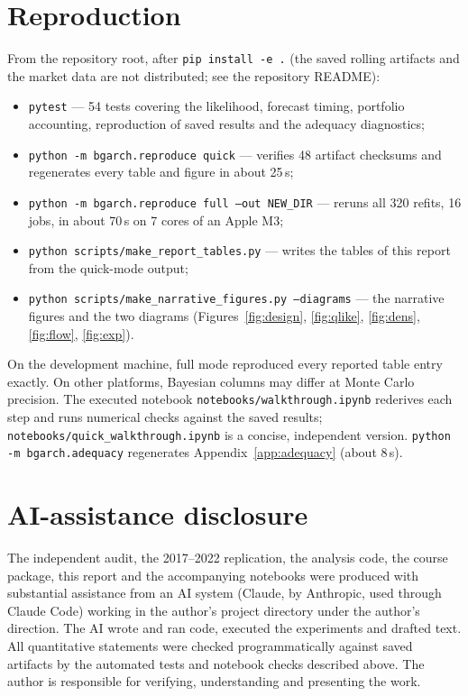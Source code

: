 \documentclass[11pt]{article}
\begin{document}
\section{Reproduction}\label{app:repro}
From the repository root, after \texttt{pip install -e .} (the saved rolling artifacts and the market data are not distributed; see the repository README):
\begin{itemize}
\item \texttt{pytest} --- 54 tests covering the likelihood, forecast timing, portfolio accounting, reproduction of saved results and the adequacy diagnostics;
\item \texttt{python -m bgarch.reproduce quick} --- verifies 48 artifact checksums and regenerates every table and figure in about 25\,s;
\item \texttt{python -m bgarch.reproduce full --out NEW\_DIR} --- reruns all 320 refits, 16 jobs, in about 70\,s on 7 cores of an Apple M3;
\item \texttt{python scripts/make\_report\_tables.py} --- writes the tables of this report from the quick-mode output;
\item \texttt{python scripts/make\_narrative\_figures.py --diagrams} --- the narrative figures and the two diagrams (Figures~\ref{fig:design}, \ref{fig:qlike}, \ref{fig:dens}, \ref{fig:flow}, \ref{fig:exp}).
\end{itemize}
On the development machine, full mode reproduced every reported table entry exactly. On other platforms, Bayesian
columns may differ at Monte Carlo precision. The executed notebook \texttt{notebooks/walkthrough.ipynb} rederives each step and
runs numerical checks against the saved results; \texttt{notebooks/quick\_walkthrough.ipynb} is a concise, independent version.
\texttt{python -m bgarch.adequacy} regenerates Appendix~\ref{app:adequacy} (about 8\,s).

\section{AI-assistance disclosure}
The independent audit, the 2017--2022 replication, the analysis code, the course package, this report and the
accompanying notebooks were produced with substantial assistance from an AI system (Claude, by Anthropic, used
through Claude Code) working in the author's project directory under the author's direction. The AI wrote and ran
code, executed the experiments and drafted text. All quantitative statements were checked programmatically against
saved artifacts by the automated tests and notebook checks described above. The author is responsible for
verifying, understanding and presenting the work.
\end{document}

